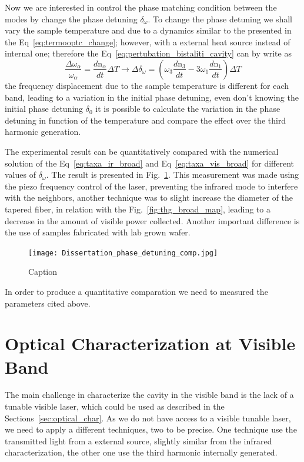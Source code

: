 Now we are interested in control the phase matching condition between the modes by change the phase detuning $\delta_\omega$. To change the phase detuning we shall vary the sample temperature and due to a dynamics similar to the presented in the Eq~\ref{eq:termooptc_change}; however, with a external heat source instead of internal one; therefore the Eq~\ref{eq:pertubation_bistaliti_cavity} can by write as 
\begin{equation}
    \frac{\Delta\omega_\alpha}{\omega_\alpha} = \frac{d\text{n}_\alpha}{dt}\Delta T \rightarrow \Delta\delta_\omega = \left(\omega_3\frac{d\text{n}_3}{dt} - 3\omega_1\frac{d\text{n}_1}{dt}\right)\Delta T
    \label{eq:temperature_mode_variation}
\end{equation}
the frequency displacement due to the sample temperature is different for each band, leading to a variation in the initial phase detuning, even don't knowing the initial phase detuning $\delta_0$ it is possible to calculate the variation in the phase detuning in function of the temperature and compare the effect over the third harmonic generation. 

The experimental result can be quantitatively compared with the numerical solution of the Eq~\ref{eq:taxa_ir_broad} and Eq~\ref{eq:taxa_vis_broad} for different values of $\delta_\omega$. The result is presented in Fig.~\ref{fig:thg_control_phase_det}. This measurement was made using the piezo frequency control of the laser, preventing the infrared mode to interfere with the neighbors, another technique was to slight increase the diameter of the tapered fiber, in relation with the Fig.~\ref{fig:thg_broad_map}, leading to a decrease in the amount of visible power collected. Another important difference is the use of samples fabricated with lab grown wafer.
\begin{figure}[!h]
    \centering
    \texttt{[image: Dissertation\_phase\_detuning\_comp.jpg]}
    \caption{Caption}
    \label{fig:thg_control_phase_det}
\end{figure}

In order to produce a quantitative comparation we need to measured the parameters cited above.  

\section{Optical Characterization at Visible Band}

The main challenge in characterize the cavity in the visible band is the lack of a tunable visible laser, which could be used as described in the Sections~\ref{sec:optical_char}. As we do not have access to a visible tunable laser, we need to apply a different techniques, two to be precise. One technique use the transmitted light from a external source, slightly similar from the infrared characterization, the other one use the third harmonic internally generated. 

